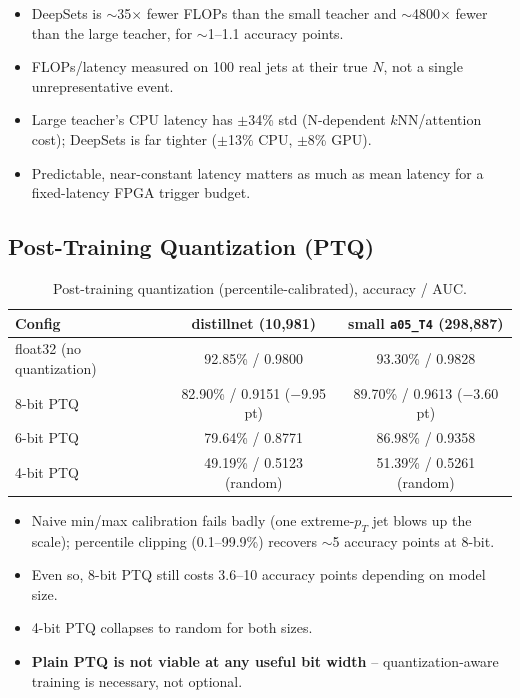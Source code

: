 \begin{itemize}
    \item DeepSets is $\sim$35$\times$ fewer FLOPs than the small teacher
    and $\sim$4800$\times$ fewer than the large teacher, for
    $\sim$1--1.1 accuracy points.
    \item FLOPs/latency measured on 100 real jets at their true $N$, not a
    single unrepresentative event.
    \item Large teacher's CPU latency has $\pm$34\% std (N-dependent
    $k$NN/attention cost); DeepSets is far tighter ($\pm$13\% CPU, $\pm$8\%
    GPU).
    \item Predictable, near-constant latency matters as much as mean
    latency for a fixed-latency FPGA trigger budget.
\end{itemize}

\subsection{Post-Training Quantization (PTQ)}
\label{sec:deepsets-ptq}

\begin{table}[h]
    \centering
    \small
    \begin{tabular}{lcc}
        \toprule
        Config & distillnet (10{,}981) & small \texttt{a05\_T4} (298{,}887) \\
        \midrule
        float32 (no quantization) & 92.85\% / 0.9800 & 93.30\% / 0.9828 \\
        8-bit PTQ  & 82.90\% / 0.9151 ($-$9.95 pt) & 89.70\% / 0.9613 ($-$3.60 pt) \\
        6-bit PTQ  & 79.64\% / 0.8771 & 86.98\% / 0.9358 \\
        4-bit PTQ  & 49.19\% / 0.5123 (random) & 51.39\% / 0.5261 (random) \\
        \bottomrule
    \end{tabular}
    \caption{Post-training quantization (percentile-calibrated), accuracy /
    AUC.}
    \label{tab:deepsets-ptq}
\end{table}

\begin{itemize}
    \item Naive min/max calibration fails badly (one extreme-$p_T$ jet
    blows up the scale); percentile clipping (0.1--99.9\%) recovers
    $\sim$5 accuracy points at 8-bit.
    \item Even so, 8-bit PTQ still costs 3.6--10 accuracy points depending
    on model size.
    \item 4-bit PTQ collapses to random for both sizes.
    \item \textbf{Plain PTQ is not viable at any useful bit width} --
    quantization-aware training is necessary, not optional.
\end{itemize}

